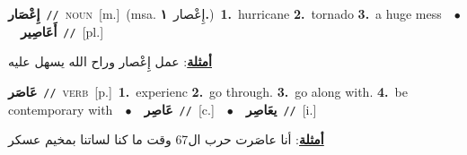 \documentclass[10pt,a4paper,twoside]{article} %
\begin{document}
\begin{multicols}{2}
{\setlength\topsep{0pt}\textbf{\foreignlanguage{arabic}{إِعْصَار}}\ {\color{gray}\texttt{//}\color{black}}\ \textsc{noun}\ [m.]\ \color{gray}(msa. \foreignlanguage{arabic}{إِعْصار}~\foreignlanguage{arabic}{\textbf{١.}})\color{black}\ \textbf{1.}~hurricane  \textbf{2.}~tornado  \textbf{3.}~a huge mess\ \ $\bullet$\ \ \setlength\topsep{0pt}\textbf{\foreignlanguage{arabic}{أَعَاصِير}}\ {\color{gray}\texttt{//}\color{black}}\ [pl.]\  \begin{flushright}\color{gray}\foreignlanguage{arabic}{\textbf{\underline{\foreignlanguage{arabic}{أمثلة}}}: عمل إِعْصار وراح الله يسهل عليه}\end{flushright}\color{black}} \vspace{2mm}

{\setlength\topsep{0pt}\textbf{\foreignlanguage{arabic}{عَاصَر}}\ {\color{gray}\texttt{//}\color{black}}\ \textsc{verb}\ [p.]\ \textbf{1.}~experienc  \textbf{2.}~go through.  \textbf{3.}~go along with.  \textbf{4.}~be contemporary with\ \ $\bullet$\ \ \setlength\topsep{0pt}\textbf{\foreignlanguage{arabic}{عَاصِر}}\ {\color{gray}\texttt{//}\color{black}}\ [c.]\ \ $\bullet$\ \ \setlength\topsep{0pt}\textbf{\foreignlanguage{arabic}{يعَاصِر}}\ {\color{gray}\texttt{//}\color{black}}\ [i.]\  \begin{flushright}\color{gray}\foreignlanguage{arabic}{\textbf{\underline{\foreignlanguage{arabic}{أمثلة}}}: أنا عاصَرت حرب ال67 وقت ما كنا لساتنا بمخيم عسكر}\end{flushright}\color{black}} \vspace{2mm}


\end{multicols}
\end{document}
